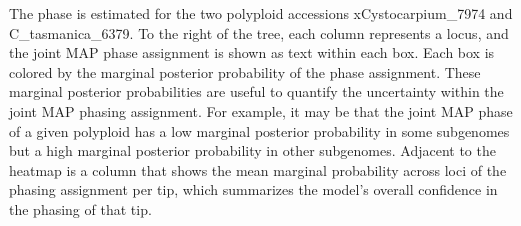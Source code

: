 \documentclass[
]{book}
\begin{document}
The phase is estimated for the two polyploid accessions xCystocarpium\_7974 and C\_tasmanica\_6379. To the right of the tree, each column represents a locus, and the joint MAP phase assignment is shown as text within each box. Each box is colored by the marginal posterior probability of the phase assignment. These marginal posterior probabilities are useful to quantify the uncertainty within the joint MAP phasing assignment. For example, it may be that the joint MAP phase of a given polyploid has a low marginal posterior probability in some subgenomes but a high marginal posterior probability in other subgenomes. Adjacent to the heatmap is a column that shows the mean marginal probability across loci of the phasing assignment per tip, which summarizes the model's overall confidence in the phasing of that tip.

  
\end{document}
